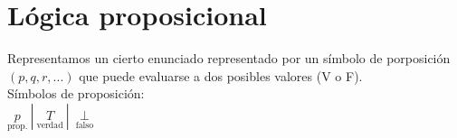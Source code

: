 \documentclass[11pt, oneside]{book}
\theoremstyle{definition} %
\begin{document}
	\section{Lógica proposicional}
	Representamos un cierto enunciado representado por un símbolo de porposición $(p,q,r,...)$ que puede evaluarse a dos posibles valores (V o F).\\
	Símbolos de proposición:\\
	$\underset{\mathrm{prop.}}p\ |\ \underset{\mathrm{verdad}}T\ |\ \underset{\mathrm{falso}}\perp$
		
	
\end{document}
